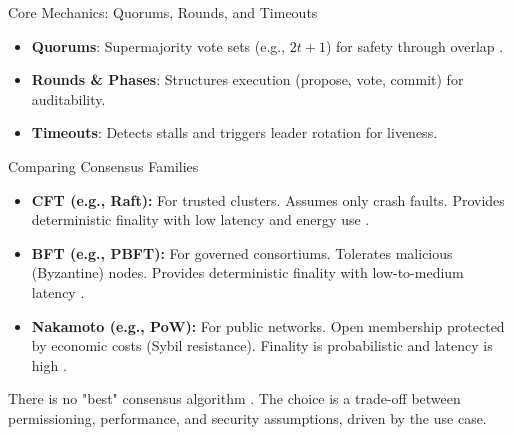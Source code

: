 \documentclass[aspectratio=169]{beamer}
\begin{document}
\begin{frame}{Core Mechanics: Quorums, Rounds, and Timeouts}
    \begin{itemize}
        \item \textbf{Quorums}: Supermajority vote sets (e.g., $2t+1$) for safety through overlap \cite{castro_practical_1999}.
        \item \textbf{Rounds \& Phases}: Structures execution (propose, vote, commit) for auditability.
        \item \textbf{Timeouts}: Detects stalls and triggers leader rotation for liveness.
    \end{itemize}
    \vfill
    \begin{tcolorbox}[colback=white, colframe=usmagray, title={Anatomy of a BFT Round (Simplified)}]
        \centering
    \end{tcolorbox}
\end{frame}

\begin{frame}{Comparing Consensus Families}
    \begin{itemize}
        \item \textbf{CFT (e.g., Raft):} For trusted clusters. Assumes only crash faults. Provides deterministic finality with low latency and energy use \cite{184040}.
        \item \textbf{BFT (e.g., PBFT):} For governed consortiums. Tolerates malicious (Byzantine) nodes. Provides deterministic finality with low-to-medium latency \cite{castro_practical_1999}.
        \item \textbf{Nakamoto (e.g., PoW):} For public networks. Open membership protected by economic costs (Sybil resistance). Finality is probabilistic and latency is high \cite{nakamoto_bitcoin_2008}.
    \end{itemize}
    \vfill
    \begin{tcolorbox}[enhanced, colback=red!20, colframe=red!75!black, fonttitle=\bfseries, title={Key Takeaway}, rounded corners, drop shadow]
    There is no "best" consensus algorithm \cite{bano_blockchain_2017}. The choice is a trade-off between permissioning, performance, and security assumptions, driven by the use case.
    \end{tcolorbox}
\end{frame}
\end{document}
